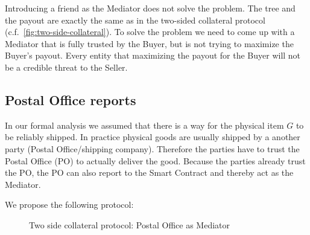 \documentclass{cacthesis}
\begin{document}
Introducing a friend as the Mediator does not solve the problem. The tree and
the payout are exactly the same as in the two-sided collateral protocol (c.f.~\ref{fig:two-side-collateral}).
To solve the problem we need to come up with a Mediator that is fully trusted by
the Buyer, but is not trying to maximize the Buyer's payout.
Every entity that maximizing the payout for the Buyer will not be a
credible threat to the Seller.


\subsection{Postal Office reports}
\label{sec:postaloffice}
In our formal analysis we assumed that there is a way for the physical item $G$ to be reliably shipped. In practice physical goods are usually shipped by a another party (Postal Office/shipping company).
Therefore the parties have to trust the Postal Office (PO) to actually deliver the good. Because the parties already trust the PO, the PO can also report to the Smart Contract and thereby act as the Mediator.\newline

We propose the following protocol:
\begin{figure}[htb!]
    \centering
    \caption{Two side collateral protocol: Postal Office as Mediator}
    \label{pro:two-side-collateral-postal}
\end{figure}
\end{document}
